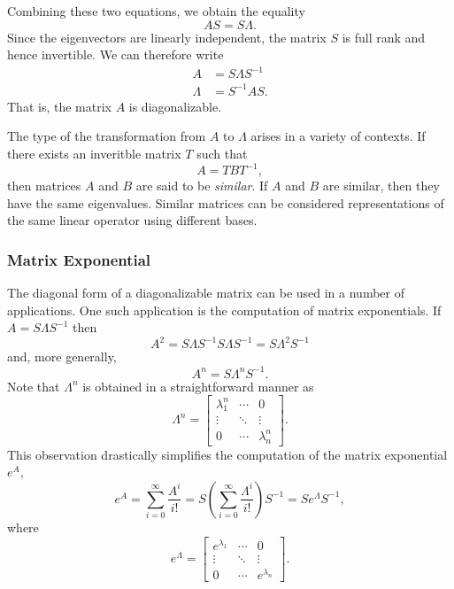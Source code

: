 Combining these two equations, we obtain the equality
\begin{equation*}
A S = S \Lambda .
\end{equation*}
Since the eigenvectors are linearly independent, the matrix $S$ is full rank and hence invertible.
We can therefore write
\begin{align*}
A &= S \Lambda S^{-1} \\
\Lambda &= S^{-1} A S .
\end{align*}
That is, the matrix $A$ is diagonalizable.

The type of the transformation from $A$ to $\Lambda$ arises in a variety of contexts.
If there exists an inveritble matrix $T$ such that
\begin{equation*}
A = T B T^{-1},
\end{equation*}
then matrices $A$ and $B$ are said to be \emph{similar}.
If $A$ and $B$ are similar, then they have the same eigenvalues.
Similar matrices can be considered representations of the same linear operator using different bases.

\subsubsection{Matrix Exponential}

The diagonal form of a diagonalizable matrix can be used in a number of applications.
One such application is the computation of matrix exponentials.
If $A = S \Lambda S^{-1}$ then
\begin{equation*}
A^2 = S \Lambda S^{-1} S \Lambda S^{-1}
= S \Lambda^2 S^{-1}
\end{equation*}
and, more generally,
\begin{equation*}
A^n = S \Lambda^n S^{-1}.
\end{equation*}
Note that $\Lambda^n$ is obtained in a straightforward manner as
\begin{equation*}
\Lambda^n = \left[ \begin{array}{ccc}
\lambda_1^n & \cdots & 0 \\
\vdots & \ddots & \vdots \\
0 & \cdots & \lambda_n^n
\end{array} \right] .
\end{equation*}
This observation drastically simplifies the computation of the matrix exponential $e^A$,
\begin{equation*}
e^A = \sum_{i=0}^{\infty} \frac{A^i}{i!}
= S \left( \sum_{i=0}^{\infty} \frac{\Lambda^i}{i!} \right) S^{-1}
= S e^{\Lambda} S^{-1},
\end{equation*}
where
\begin{equation*}
e^{\Lambda} = \left[ \begin{array}{ccc}
e^{\lambda_1} & \cdots & 0 \\
\vdots & \ddots & \vdots \\
0 & \cdots & e^{\lambda_n}
\end{array} \right] .
\end{equation*}

